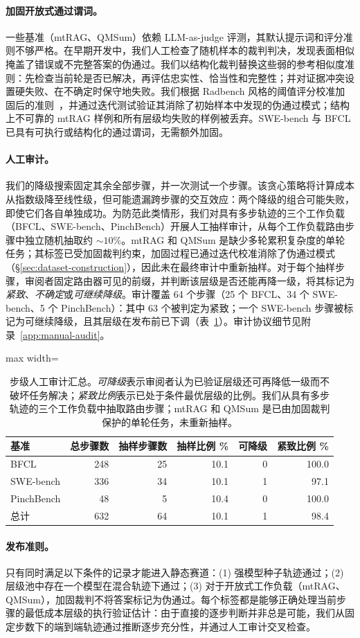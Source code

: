 \paragraph{加固开放式通过谓词。}
一些基准（mtRAG、QMSum）依赖 LLM-as-judge 评测，其默认提示词和评分准则不够严格。在早期开发中，我们人工检查了随机样本的裁判判决，发现表面相似掩盖了错误或不完整答案的伪通过。我们以结构化裁判替换这些弱的参考相似度准则：先检查当前轮是否已解决，再评估忠实性、恰当性和完整性；并对证据冲突设置硬失败、在不确定时保守地失败。我们根据 Radbench 风格的阈值评分校准加固后的准则~\citep{kuo2025radbench}，并通过迭代测试验证其消除了初始样本中发现的伪通过模式；结构上不可靠的 mtRAG 样例和所有层级均失败的样例被丢弃。SWE-bench 与 BFCL 已具有可执行或结构化的通过谓词，无需额外加固。

\paragraph{人工审计。}
我们的降级搜索固定其余全部步骤，并一次测试一个步骤。该贪心策略将计算成本从指数级降至线性级，但可能遗漏跨步骤的交互效应：两个降级的组合可能失败，即使它们各自单独成功。为防范此类情形，我们对具有多步轨迹的三个工作负载（BFCL、SWE-bench、PinchBench）开展人工抽样审计，从每个工作负载路由步骤中独立随机抽取约 ${\sim}10\%$。mtRAG 和 QMSum 是缺少多轮累积复杂度的单轮任务；其标签已受加固裁判约束，加固过程已通过迭代校准消除了伪通过模式（\S\ref{sec:dataset-construction}），因此未在最终审计中重新抽样。对于每个抽样步骤，审阅者固定路由器可见的前缀，并判断该层级是否还能再降一级，将其标记为\emph{紧致}、\emph{不确定}或\emph{可继续降级}。审计覆盖 64 个步骤（25 个 BFCL、34 个 SWE-bench、5 个 PinchBench）：其中 63 个被判定为紧致；一个 SWE-bench 步骤被标记为可继续降级，且其层级在发布前已下调（表~\ref{tab:manual-audit-main}）。审计协议细节见附录~\ref{app:manual-audit}。

\begin{table}[t]
\centering
\small
\begin{adjustbox}{max width=\linewidth}
\begin{tabular}{lrrrrr}
\toprule
基准 & 总步骤数 & 抽样步骤数 & 抽样比例 \% & 可降级 & 紧致比例 \% \\
\midrule
BFCL & 248 & 25 & 10.1 & 0 & 100.0 \\
SWE-bench & 336 & 34 & 10.1 & 1 & 97.1 \\
PinchBench & 48 & 5 & 10.4 & 0 & 100.0 \\
\midrule
总计 & 632 & 64 & 10.1 & 1 & 98.4 \\
\bottomrule
\end{tabular}
\end{adjustbox}
\caption{步级人工审计汇总。\emph{可降级}表示审阅者认为已验证层级还可再降低一级而不破坏任务解决；\emph{紧致比例}表示已处于条件最优层级的比例。我们从具有多步轨迹的三个工作负载中抽取路由步骤；mtRAG 和 QMSum 是已由加固裁判保护的单轮任务，未重新抽样。}
\label{tab:manual-audit-main}
\end{table}

\paragraph{发布准则。}
只有同时满足以下条件的记录才能进入静态赛道：(1) 强模型种子轨迹通过；(2) 层级池中存在一个模型在混合轨迹下通过；(3) 对于开放式工作负载（mtRAG、QMSum），加固裁判不将答案标记为伪通过。每个标签都是能够正确处理当前步骤的最低成本层级的执行验证估计：由于直接的逐步判断并非总是可能，我们从固定步数下的端到端轨迹通过推断逐步充分性，并通过人工审计交叉检查。
